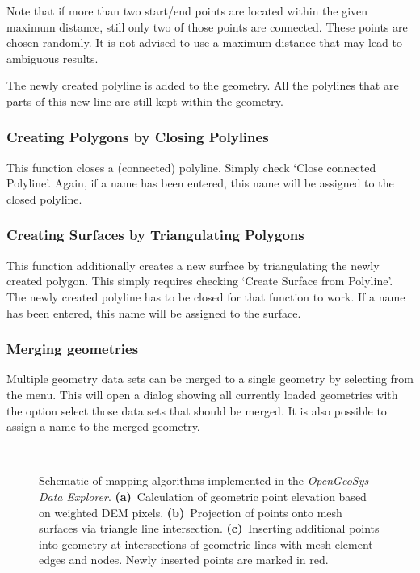 Note that if more than two start/end points are located within the given maximum distance, still only two of those points are connected. These points are chosen randomly. It is not advised to use a maximum distance that may lead to ambiguous results.

The newly created polyline is added to the geometry. All the polylines that are parts of this new line are still kept within the geometry.

\subsubsection{Creating Polygons by Closing Polylines}
This function closes a (connected) polyline. Simply check `Close connected Polyline'. Again, if a name has been entered, this name will be assigned to the closed polyline.

\subsubsection{Creating Surfaces by Triangulating Polygons}
This function additionally creates a new surface by triangulating the newly created polygon. This simply requires checking `Create Surface from Polyline'. The newly created polyline has to be closed for that function to work. If a name has been entered, this name will be assigned to the surface.

\subsubsection{Merging geometries}

Multiple geometry data sets can be merged to a single geometry by selecting  from the menu. This will open a dialog showing all currently loaded geometries with the option select those data sets that should be merged. It is also possible to assign a name to the merged geometry.

\begin{figure}[tb]
  \centering
  \,
  \,
  \caption{Schematic of mapping algorithms implemented in the \emph{OpenGeoSys Data Explorer}. \textbf{(a)}~Calculation of geometric point elevation based on weighted DEM pixels. \textbf{(b)}~Projection of points onto mesh surfaces via triangle line intersection. \textbf{(c)}~Inserting additional points into geometry at intersections of geometric lines with mesh element edges and nodes. Newly inserted points are marked in red.}
  \label{fig:geomappingschema}
\end{figure}

